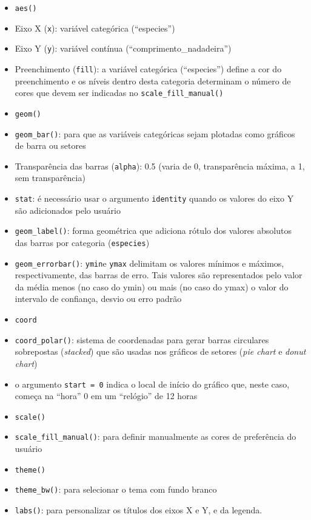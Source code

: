 \documentclass[
]{article}
\providecommand{\tightlist}{%
  \setlength{\itemsep}{0pt}\setlength{\parskip}{0pt}}
\begin{document}
\begin{itemize}
\tightlist
\item
  \texttt{aes()}
\item
  Eixo X (\texttt{x}): variável categórica (``especies'')
\item
  Eixo Y (\texttt{y}): variável contínua (``comprimento\_nadadeira'')
\item
  Preenchimento (\texttt{fill}): a variável categórica (``especies'') define a cor do preenchimento e os níveis dentro desta categoria determinam o número de cores que devem ser indicadas no \texttt{scale\_fill\_manual()}
\item
  \texttt{geom()}
\item
  \texttt{geom\_bar()}: para que as variáveis categóricas sejam plotadas como gráficos de barra ou setores
\item
  Transparência das barras (\texttt{alpha}): 0.5 (varia de 0, transparência máxima, a 1, sem transparência)
\item
  \texttt{stat}: é necessário usar o argumento \texttt{identity} quando os valores do eixo Y são adicionados pelo usuário
\item
  \texttt{geom\_label()}: forma geométrica que adiciona rótulo dos valores absolutos das barras por categoria (\texttt{especies})
\item
  \texttt{geom\_errorbar()}: \texttt{ymin}e \texttt{ymax} delimitam os valores mínimos e máximos, respectivamente, das barras de erro. Tais valores são representados pelo valor da média menos (no caso do ymin) ou mais (no caso do ymax) o valor do intervalo de confiança, desvio ou erro padrão
\item
  \texttt{coord}
\item
  \texttt{coord\_polar()}: sistema de coordenadas para gerar barras circulares sobrepostas (\emph{stacked}) que são usadas nos gráficos de setores (\emph{pie chart} e \emph{donut chart})
\item
  o argumento \texttt{start\ =\ 0} indica o local de início do gráfico que, neste caso, começa na ``hora'' 0 em um ``relógio'' de 12 horas
\item
  \texttt{scale()}
\item
  \texttt{scale\_fill\_manual()}: para definir manualmente as cores de preferência do usuário
\item
  \texttt{theme()}
\item
  \texttt{theme\_bw()}: para selecionar o tema com fundo branco
\item
  \texttt{labs()}: para personalizar os títulos dos eixos X e Y, e da legenda.
\end{itemize}
\end{document}

